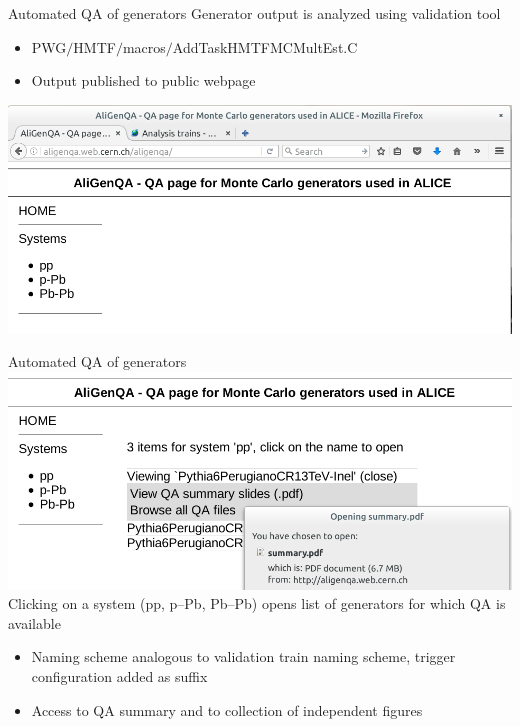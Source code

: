 \documentclass[table]{beamer}
\begin{document}
\begin{frame}{Automated QA of generators}
Generator output is analyzed using validation tool
\begin{itemize}
    \item PWG$/$HMTF$/$macros$/$AddTaskHMTFMCMultEst.C
    \item Output published to public webpage
\end{itemize}
    \includegraphics[width=\textwidth]{../fig/aligenqa_webpage.png}
\end{frame}

\begin{frame}{Automated QA of generators}
    \includegraphics[width=\textwidth]{../fig/open_page.png} \\
    Clicking on a system (pp, p--Pb, Pb--Pb) opens list of generators for which QA is available
\begin{itemize}
    \item Naming scheme analogous to validation train naming scheme, trigger configuration added as suffix
    \item Access to QA summary and to collection of independent figures
\end{itemize}
\end{frame}
\end{document}
